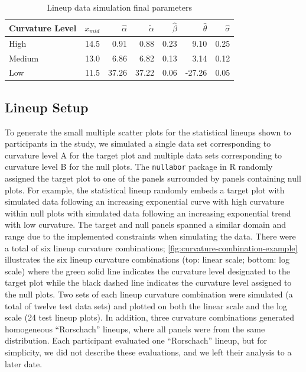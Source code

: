 \documentclass[12pt]{article}
\begin{document}
\begin{table}

\caption{\label{tab:parameter-data}Lineup data simulation final parameters}
\centering
\begin{tabular}[t]{lrrrrrr}
\toprule
Curvature Level & $x_{mid}$ & $\hat\alpha$ & $\tilde\alpha$ & $\hat\beta$ & $\hat\theta$ & $\hat\sigma$\\
\midrule
High & 14.5 & 0.91 & 0.88 & 0.23 & 9.10 & 0.25\\
Medium & 13.0 & 6.86 & 6.82 & 0.13 & 3.14 & 0.12\\
Low & 11.5 & 37.26 & 37.22 & 0.06 & -27.26 & 0.05\\
\bottomrule
\end{tabular}
\end{table}

\hypertarget{lineup-setup}{%
\subsection{Lineup Setup}\label{lineup-setup}}

To generate the small multiple scatter plots for the statistical lineups
shown to participants in the study, we simulated a single data set
corresponding to curvature level A for the target plot and multiple data
sets corresponding to curvature level B for the null plots. The
\texttt{nullabor} package in R \citep{buja_statistical_2009} randomly
assigned the target plot to one of the panels surrounded by panels
containing null plots. For example, the statistical lineup randomly
embeds a target plot with simulated data following an increasing
exponential curve with high curvature within null plots with simulated
data following an increasing exponential trend with low curvature. The
target and null panels spanned a similar domain and range due to the
implemented constraints when simulating the data. There were a total of
six lineup curvature combinations;
\cref{fig:curvature-combination-example} illustrates the six lineup
curvature combinations (top: linear scale; bottom: log scale) where the
green solid line indicates the curvature level designated to the target
plot while the black dashed line indicates the curvature level assigned
to the null plots. Two sets of each lineup curvature combination were
simulated (a total of twelve test data sets) and plotted on both the
linear scale and the log scale (24 test lineup plots). In addition,
three curvature combinations generated homogeneous ``Rorschach''
lineups, where all panels were from the same distribution. Each
participant evaluated one ``Rorschach'' lineup, but for simplicity, we
did not describe these evaluations, and we left their analysis to a
later date.
\end{document}
